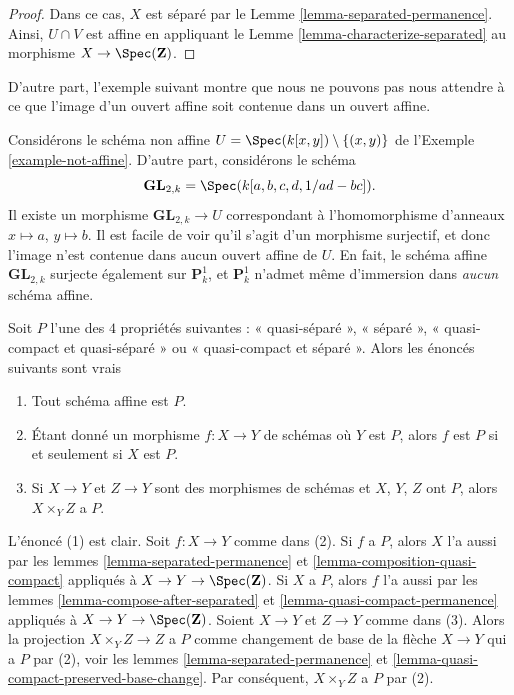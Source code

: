 \begin{proof}
Dans ce cas,  $X$  est séparé par le Lemme  \ref{lemma-separated-permanence}. Ainsi,
 $U \cap V$  est affine en appliquant le Lemme  \ref{lemma-characterize-separated}  au morphisme
 $X \to \Spec(\mathbf{Z})$.
\end{proof}

\noindent
D'autre part, l'exemple suivant montre que nous ne pouvons pas nous attendre à ce
que l'image d'un ouvert affine soit contenue dans un ouvert affine.

\begin{example}
\label{example-image-affine-projective}
Considérons le schéma non affine  $U = \Spec(k[x, y]) \setminus \{(x, y)\}$  de l'Exemple  \ref{example-not-affine}. D'autre
part, considérons le schéma
$$
\mathbf{GL}_{2, k} = \Spec(k[a, b, c, d, 1/ad - bc]).
$$
Il existe un morphisme  $\mathbf{GL}_{2, k} \to U$  correspondant à l'homomorphisme d'anneaux
 $x \mapsto a$,  $y \mapsto b$. Il est facile de voir qu'il s'agit d'un morphisme
surjectif, et donc l'image n'est contenue dans aucun ouvert affine de
 $U$. En fait, le schéma affine  $\mathbf{GL}_{2, k}$  surjecte également sur
 $\mathbf{P}^1_k$, et  $\mathbf{P}^1_k$  n'admet même d'immersion dans
 {\it aucun} schéma affine.
\end{example}

\begin{remark}
\label{remark-quasi-compact-and-quasi-separated}
Soit  $P$  l'une des  $4$  propriétés suivantes : «
quasi-séparé », « séparé », « quasi-compact et quasi-séparé » ou « quasi-compact
et séparé ». Alors les énoncés suivants sont vrais
\begin{enumerate}
\item Tout schéma affine est  $P$.
\item Étant donné un morphisme  $f : X \to Y$  de schémas où  $Y$  est  $P$,
alors  $f$  est  $P$  si et seulement si  $X$  est
 $P$.
\item Si  $X \to Y$  et  $Z \to Y$  sont des morphismes de schémas et  $X$,
 $Y$,  $Z$  ont  $P$, alors  $X \times_Y Z$  a  $P$.
\end{enumerate}
L'énoncé (1) est clair. Soit  $f : X \to Y$  comme dans (2). Si  $f$  a
 $P$, alors  $X$  l'a aussi par les lemmes  \ref{lemma-separated-permanence}  et
 \ref{lemma-composition-quasi-compact}  appliqués à  $X \to Y \to \Spec(\mathbf{Z})$. Si  $X$  a  $P$, alors
 $f$  l'a aussi par les lemmes  \ref{lemma-compose-after-separated}  et  \ref{lemma-quasi-compact-permanence}  appliqués à
 $X \to Y \to \Spec(\mathbf{Z})$. Soient  $X \to Y$  et  $Z \to Y$  comme dans (3). Alors la
projection  $X \times_Y Z \to Z$  a  $P$  comme changement de base de la flèche
 $X \to Y$  qui a  $P$  par (2), voir les lemmes  \ref{lemma-separated-permanence}  et
 \ref{lemma-quasi-compact-preserved-base-change}. Par conséquent,  $X \times_Y Z$  a  $P$  par (2).
\end{remark}





